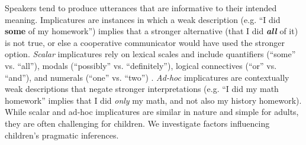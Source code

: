 \documentclass[10pt,letterpaper]{article}
\begin{document}
Speakers tend to produce utterances that are informative to their intended meaning. Implicatures are instances in which a weak description (e.g. ``I did \textbf{some} of my homework'') implies that a stronger alternative (that I did \emph{\textbf{all}} of it) is not true, or else a cooperative communicator would have used the stronger option. \emph{Scalar} implicatures rely on lexical scales and include quantifiers (``some'' vs. ``all''), modals (``possibly'' vs. ``definitely''), logical connectives (``or'' vs. ``and''), and numerals (``one'' vs. ``two'') \citep{horn1972}. \emph{Ad-hoc} implicatures are contextually weak descriptions that negate stronger interpretations (e.g. ``I did my math homework'' implies that I did \emph{only} my math, and not also my history homework).  While scalar and ad-hoc implicatures are similar in nature and simple for adults, they are often challenging for children. We investigate factors influencing children's pragmatic inferences.


\end{document}
